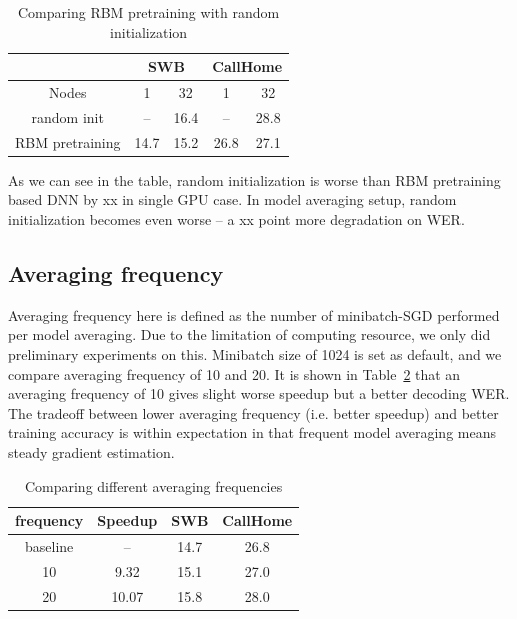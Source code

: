 \documentclass{article}
\begin{document}
\begin{table}
  \centering
  \begin{tabular}{c|c|c|c|c}
    \hline
    & \multicolumn{2}{c|}{SWB}  & \multicolumn{2}{c}{CallHome} \\
    \hline
    Nodes          &  1     & 32     &   1    & 32\\
    \hline
    random init     & --    & 16.4   &  --    & 28.8 \\
    \hline
    RBM pretraining & 14.7  & 15.2   & 26.8   & 27.1 \\
    \hline
  \end{tabular}
  \caption{Comparing RBM pretraining with random initialization}
  \label{tab:init}
\end{table}
As we can see in the table, random initialization is worse than RBM pretraining based DNN by xx in single GPU case.
In model averaging setup, random initialization becomes even worse -- a xx point more degradation on WER.

\subsection{Averaging frequency}
Averaging frequency here is defined as the number of minibatch-SGD performed per model averaging.
Due to the limitation of computing resource, we only did preliminary experiments on this. Minibatch size of 1024 
is set as default, and we compare averaging frequency of 10 and 20. It is shown in Table~\ref{tab:freq} that an averaging 
frequency of 10 gives slight worse speedup but a better decoding WER. The tradeoff between lower averaging frequency 
(i.e. better speedup) and better training accuracy is within expectation in that frequent model averaging means 
steady gradient estimation.

\begin{table}
  \centering
  \begin{tabular}{c|c|c|c}
    \hline
    frequency   & Speedup   & SWB   & CallHome \\
    \hline
    baseline    &   --      & 14.7  & 26.8\\
    \hline
    10          & 9.32      & 15.1  & 27.0 \\
    \hline
    20          & 10.07     & 15.8  & 28.0 \\
    \hline
  \end{tabular}
  \caption{Comparing different averaging frequencies}
  \label{tab:freq}
\end{table}
\end{document}
